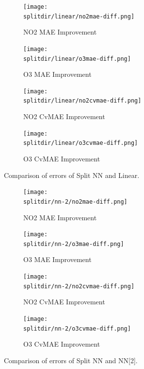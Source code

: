\documentclass[journal abbreviation, manuscript]{copernicus}
\begin{document}
\begin{figure}[H]
\begin{subfigure}{0.49\textwidth}
\texttt{[image: \\splitdir/linear/no2mae-diff.png]}
\caption{NO2 MAE Improvement}
\end{subfigure}
\begin{subfigure}{0.49\textwidth}
\texttt{[image: \\splitdir/linear/o3mae-diff.png]}
\caption{O3 MAE Improvement}
\end{subfigure}
\begin{subfigure}{0.49\textwidth}
\texttt{[image: \\splitdir/linear/no2cvmae-diff.png]}
\caption{NO2 CvMAE Improvement}
\end{subfigure}
\begin{subfigure}{0.49\textwidth}
\texttt{[image: \\splitdir/linear/o3cvmae-diff.png]}
\caption{O3 CvMAE Improvement}
\end{subfigure}
\caption{Comparison of errors of Split NN and Linear.}
\end{figure}

\begin{figure}[H]
\begin{subfigure}{0.49\textwidth}
\texttt{[image: \\splitdir/nn-2/no2mae-diff.png]}
\caption{NO2 MAE Improvement}
\end{subfigure}
\begin{subfigure}{0.49\textwidth}
\texttt{[image: \\splitdir/nn-2/o3mae-diff.png]}
\caption{O3 MAE Improvement}
\end{subfigure}
\begin{subfigure}{0.49\textwidth}
\texttt{[image: \\splitdir/nn-2/no2cvmae-diff.png]}
\caption{NO2 CvMAE Improvement}
\end{subfigure}
\begin{subfigure}{0.49\textwidth}
\texttt{[image: \\splitdir/nn-2/o3cvmae-diff.png]}
\caption{O3 CvMAE Improvement}
\end{subfigure}
\caption{Comparison of errors of Split NN and NN[2].}
\end{figure}
\end{document}
